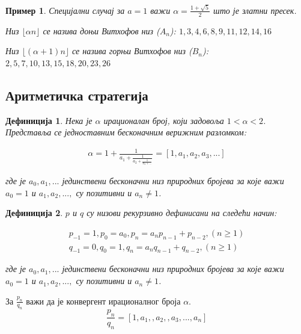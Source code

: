 \documentclass[a4paper]{article}
\newtheorem{example}{Пример}
\newtheorem{definition}{Дефиниција}
\begin{document}
\begin{example}
	Специјални случај за $ a = 1 $ важи $ \alpha = \frac{1 + \sqrt{5}}{2} $ што је златни пресек.
	
	Низ $ \lfloor \alpha n \rfloor $ се назива доњи Витхофов низ ($ A_{n} $):
	$ 1, 3, 4, 6, 8, 9, 11, 12, 14, 16 $
	
	Низ $ \lfloor (\alpha + 1) n \rfloor $ се назива горњи Витхофов низ ($ B_{n} $):
	$ 2, 5, 7, 10, 13, 15, 18, 20, 23, 26 $
\end{example}

\subsection{Аритметичка стратегија}

\begin{definition}
	\label{def:verizni_razlomak}	
	Нека је $ \alpha $ ирационалан број, који задовоља $ 1 < \alpha < 2 $. Представља се једноставним бесконачним верижним разломком:
	
	\begin{eqnarray}
	\alpha = 1 + \frac{1}{a_{1} + \frac{1}{a_{2} + \frac{1}{a_{3} + ...}}} = [1, a_{1}, a_{2}, a_{3}, ...] 
	\end{eqnarray}
	
	где је $ a_{0}, a_{1}, ... $ јединствени бесконачни низ природних бројева за које важи $ a_{0} = 1 $ и $ a_{1}, a_{2}, ... ,  $ су позитивни и $ a_{n} \ne 1 $.
\end{definition}

\begin{definition}
	\label{def:p_q_nizovi}
	$ p $ и $ q $ су низови рекурзивно дефинисани на следећи начин:
	
	\begin{eqnarray}
		p_{-1} = 1, p_{0} = a_{0}, p_{n} = a_{n}p_{n-1} + p_{n-2}, (n \geq 1 )\\
		q_{-1} = 0, q_{0} = 1, q_{n} = a_{n}q_{n-1} + q_{n-2}, (n \geq 1 )
	\end{eqnarray}
	
	где је $ a_{0}, a_{1}, ... $ јединствени бесконачни низ природних бројева за које важи $ a_{0} = 1 $ и $ a_{1}, a_{2}, ... ,  $ су позитивни и $ a_{n} \ne 1 $.
\end{definition}

За $ \frac{p_{n}}{q_{n}} $ важи да је конвергент ирационалног броја $ \alpha $.  
\begin{displaymath}
	\frac{p_{n}}{q_{n}} = [1, a_{1}, , a_{2}, , a_{3}, ..., a_{n}]
\end{displaymath}
\end{document}

